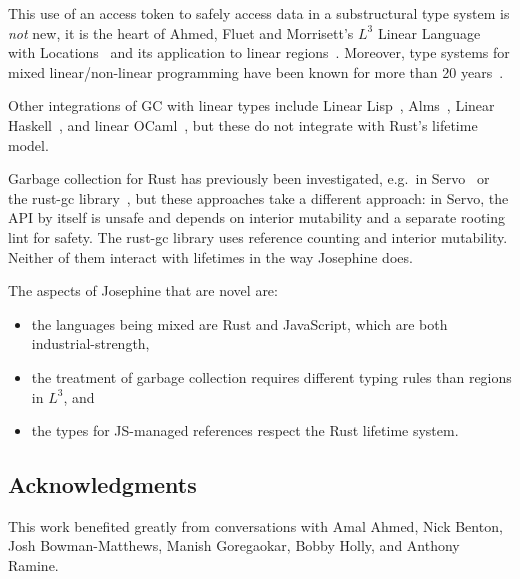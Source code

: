 This use of an access token to safely access data in a substructural
type system is \emph{not} new, it is the heart of Ahmed, Fluet and
Morrisett's $L^3$ Linear Language with Locations~\cite{l3} and its
application to linear regions~\cite{regions}.
Moreover, type systems for mixed linear/non-linear programming have
been known for more than 20 years~\cite{mixed}.

Other integrations of GC with linear types include Linear Lisp~\cite{linear-lisp},
Alms~\cite{alms},
Linear Haskell~\cite{linear-haskell}, and
linear OCaml~\cite{linear-ocaml}, but these do not integrate with Rust's
lifetime model.

Garbage collection for Rust has previously been investigated,
e.g.~in Servo~\cite{servo-gc} or the rust-gc library~\cite{rust-gc},
but these approaches take a different approach: in Servo, the
API by itself is unsafe and depends on interior mutability and
a separate rooting lint for safety. The rust-gc library uses
reference counting and interior mutability. Neither of them interact
with lifetimes in the way Josephine does.

The aspects of Josephine that are novel are:
\begin{itemize}

\item the languages being mixed are Rust and 
  JavaScript, which are both industrial-strength,

\item the treatment of garbage collection requires
  different typing rules than regions in $L^3$, and

\item the types for JS-managed references respect the Rust
  lifetime system.

\end{itemize}

\subsection*{Acknowledgments}

This work benefited greatly from conversations with
Amal Ahmed,
Nick Benton,
Josh Bowman-Matthews,
Manish Goregaokar,
Bobby Holly, and
Anthony Ramine.
